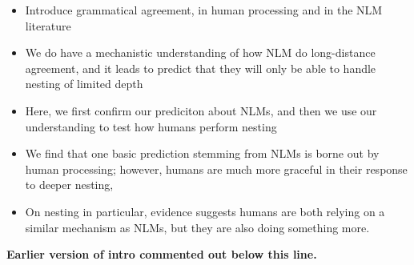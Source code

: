 \begin{itemize}
\item Introduce grammatical agreement, in human processing and in the
  NLM literature
\item We do have a mechanistic understanding of how NLM do
  long-distance agreement, and it leads to predict that they will only
  be able to handle nesting of limited depth
\item Here, we first confirm our prediciton about NLMs, and then we
  use our understanding to test how humans perform nesting
\item We find that one basic prediction stemming from NLMs is borne
  out by human processing; however, humans are much more graceful in
  their response to deeper nesting,
\item On nesting in particular, evidence suggests humans are both
  relying on a similar mechanism as NLMs, but they are also doing something more.
\end{itemize}


\textbf{Earlier version of intro commented out below this line.}




